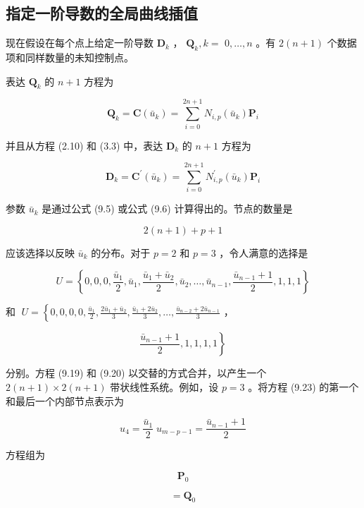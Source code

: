 \documentclass[../main.tex]{subfiles}
\begin{document}
\subsection{指定一阶导数的全局曲线插值}

现在假设在每个点上给定一阶导数 \({\mathbf{D}}_{k}\) ， \({\mathbf{Q}}_{k},k =\)  \(0,\ldots ,n\) 。有 \(2\left( {n + 1}\right)\) 个数据项和同样数量的未知控制点。



表达 \({\mathbf{Q}}_{k}\) 的 \(n + 1\) 方程为

\[
{\mathbf{Q}}_{k} = \mathbf{C}\left( {\bar{u}}_{k}\right)  = \mathop{\sum }\limits_{{i = 0}}^{{{2n} + 1}}{N}_{i,p}\left( {\bar{u}}_{k}\right) {\mathbf{P}}_{i} \tag{9.19}
\]

并且从方程 (2.10) 和 (3.3) 中，表达 \({\mathbf{D}}_{k}\) 的 \(n + 1\) 方程为

\[
{\mathbf{D}}_{k} = {\mathbf{C}}^{\prime }\left( {\bar{u}}_{k}\right)  = \mathop{\sum }\limits_{{i = 0}}^{{{2n} + 1}}{N}_{i,p}^{\prime }\left( {\bar{u}}_{k}\right) {\mathbf{P}}_{i} \tag{9.20}
\]

参数 \({\bar{u}}_{k}\) 是通过公式 (9.5) 或公式 (9.6) 计算得出的。节点的数量是

\[
2\left( {n + 1}\right)  + p + 1 \tag{9.21}
\]

应该选择以反映 \({\bar{u}}_{k}\) 的分布。对于 \(p = 2\) 和 \(p = 3\) ，令人满意的选择是

\[
U = \left\{  {0,0,0,\frac{{\bar{u}}_{1}}{2},{\bar{u}}_{1},\frac{{\bar{u}}_{1} + {\bar{u}}_{2}}{2},{\bar{u}}_{2},\ldots ,{\bar{u}}_{n - 1},\frac{{\bar{u}}_{n - 1} + 1}{2},1,1,1}\right\}   \tag{9.22}
\]

和 \(\;U = \left\{  {0,0,0,0,\frac{{\bar{u}}_{1}}{2},\frac{2{\bar{u}}_{1} + {\bar{u}}_{2}}{3},\frac{{\bar{u}}_{1} + 2{\bar{u}}_{2}}{3},\ldots ,\frac{{\bar{u}}_{n - 2} + 2{\bar{u}}_{n - 1}}{3}}\right.\) ，

\[
\left. {\frac{{\bar{u}}_{n - 1} + 1}{2},1,1,1,1}\right\}   \tag{9.23}
\]

分别。方程 (9.19) 和 (9.20) 以交替的方式合并，以产生一个 \(2\left( {n + 1}\right)  \times  2\left( {n + 1}\right)\) 带状线性系统。例如，设 \(p = 3\) 。将方程 (9.23) 的第一个和最后一个内部节点表示为

\[
{u}_{4} = \frac{{\bar{u}}_{1}}{2}\;{u}_{m - p - 1} = \frac{{\bar{u}}_{n - 1} + 1}{2}
\]

方程组为

\[
{\mathbf{P}}_{0}
\]

\[
= {\mathbf{Q}}_{0}
\]
\end{document}
